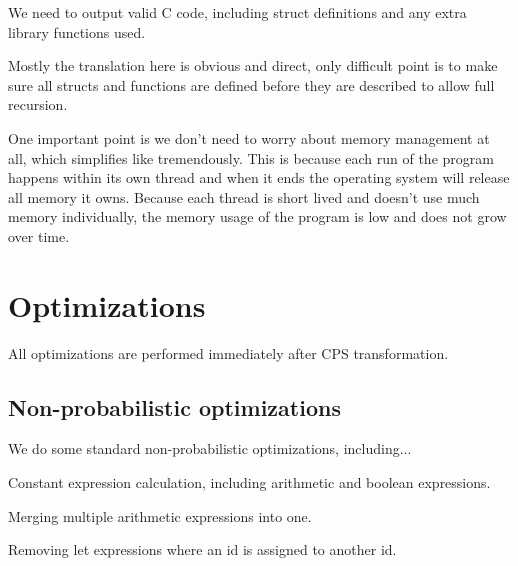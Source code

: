 \documentclass[a4paper]{article}
\begin{document}
We need to output valid C code, including struct definitions and any extra library functions used.

Mostly the translation here is obvious and direct, only difficult point is to make sure all structs and functions are defined before they are described to allow full recursion.

One important point is we don't need to worry about memory management at all, which simplifies like tremendously. This is because each run of the program happens within its own thread and when it ends the operating system will release all memory it owns. Because each thread is short lived and doesn't use much memory individually, the memory usage of the program is low and does not grow over time.




\section{Optimizations}

All optimizations are performed immediately after CPS transformation.



\subsection{Non-probabilistic optimizations}

We do some standard non-probabilistic optimizations, including...

Constant expression calculation, including arithmetic and boolean expressions.

Merging multiple arithmetic expressions into one.

Removing let expressions where an id is assigned to another id.
\end{document}
